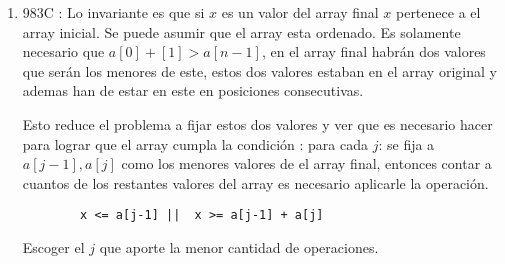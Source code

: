 \documentclass[14pt]{extarticle}
\begin{document}
\begin{enumerate}
    \item 983C : Lo invariante es que si $x$ es un valor del array final $x$ pertenece a el array inicial.  Se puede asumir que el array esta ordenado. Es solamente necesario que $a[0] + [1] > a[n-1]$, en el array final habrán dos valores que serán los menores de este, estos dos valores estaban en el array original y ademas han de estar en este en posiciones consecutivas. 
    
    Esto reduce el problema a fijar estos dos valores y ver que es necesario hacer para lograr que el array cumpla la condición : para cada $j$: se fija a $a[j-1], a[j]$ como los menores valores de el array final, entonces contar a cuantos de los restantes valores del array es necesario aplicarle la operación. \begin{verbatim}
        x <= a[j-1] ||  x >= a[j-1] + a[j]
    \end{verbatim}
    Escoger el $j$ que aporte la menor cantidad de operaciones.  
\end{enumerate}
\end{document}
